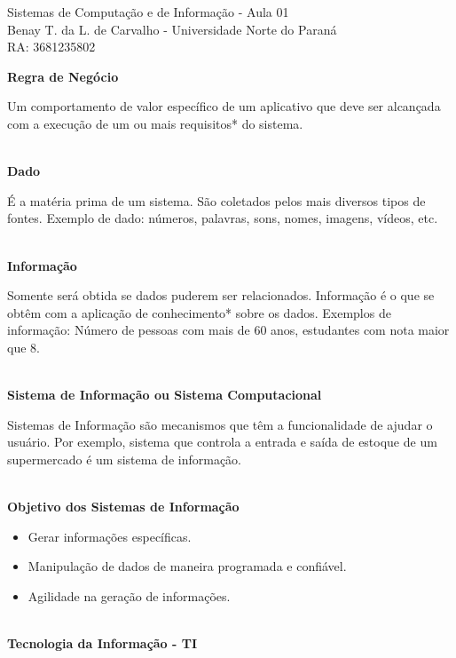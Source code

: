 \documentclass[12pt, a4paper]{article}
\begin{document}
\thispagestyle{empty}

\begin{center}
    
    {\LARGE
        Sistemas de Computação e de Informação - Aula 01\\
    }
    {\Large
        Benay T. da L. de Carvalho - Universidade Norte do Paraná\\
        RA: 3681235802
    }

\end{center}

\vspace*{2cm}

\large
\noindent
\textbf{Regra de Negócio}

Um comportamento de valor específico de um aplicativo que deve ser alcançada
com a execução de um ou mais requisitos* do sistema.

\noindent
\textbf{\\Dado}

É a matéria prima de um sistema. 
São coletados pelos mais diversos tipos de fontes.
Exemplo de dado: números, palavras, sons, nomes, imagens, vídeos, etc.

\noindent
\textbf{\\Informação}

Somente será obtida se dados puderem ser relacionados. 
Informação é o que se obtêm com a aplicação de conhecimento* sobre os dados.
Exemplos de informação: Número de pessoas com mais de 60 anos, 
estudantes com nota maior que 8.

\noindent
\textbf{\\Sistema de Informação ou Sistema Computacional}

Sistemas de Informação são mecanismos que têm a funcionalidade de ajudar o usuário.
Por exemplo, sistema que controla a entrada e saída de estoque de um supermercado 
é um sistema de informação.

\noindent
\textbf{\\Objetivo dos Sistemas de Informação}
\begin{itemize}
    \item Gerar informações específicas.
    \item Manipulação de dados de maneira programada e confiável.
    \item Agilidade na geração de informações.
\end{itemize}

\noindent
\textbf{\\Tecnologia da Informação - TI}
\end{document}
